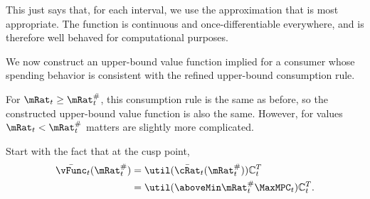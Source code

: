 
  This just says that, for each interval, we use the approximation that
  is most appropriate.  The function is continuous and
  once-differentiable everywhere, and is therefore well behaved for
  computational purposes.

  \begin{comment}
    In practice, in our problem the difference due to this refinement is displayed in Figure \ref{fig:IntExpFOCInvPesReaOpt45GapPlot}.
    \hypertarget{IntExpFOCInvPesReaOpt45GapPlot}{}
    \begin{figure}
      \texttt{[image: ./Figures/IntExpFOCInvPesReaOpt45GapPlot]}
      \caption{Difference Between $\Alt{\Hi{\cFunc}}_{L, T-1}$ and $\Alt{\Hi{\cFunc}}_{H,T-1}$ is Small}
      \label{fig:IntExpFOCInvPesReaOpt45GapPlot}
    \end{figure}
  \end{comment}

  We now construct an upper-bound value function implied for a consumer whose spending behavior
  is consistent with the refined upper-bound consumption rule.

  For $\mRat_{t} \geq \mRat_{t}^{\#}$, this consumption rule is the same as before,
  so the constructed upper-bound value function is also the same.  However, for
  values $\mRat_{t} < \mRat_{t}^{\#}$ matters are slightly more complicated.

  Start with the fact that at the cusp point,
  \begin{equation*}\begin{gathered}\begin{aligned}
    \bar{\vFunc}_{t}(\mtCusp)  & = \util(\bar{\cRat}_{t}(\mtCusp))\mathbb{C}_{t}^{T} \\
                               & =  \util(\aboveMin \mtCusp  \MaxMPC_{t})\mathbb{C}_{t}^{T}
                                  .
  \end{aligned}\end{gathered}\end{equation*}

